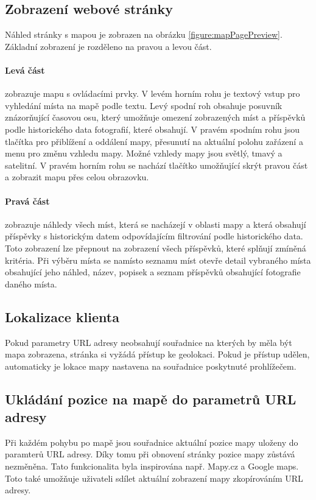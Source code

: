 \documentclass[12pt, a4paper,
 twoside,        %
 openright
]{report}
\begin{document}
\subsection{Zobrazení webové stránky}
Náhled stránky s mapou je zobrazen na obrázku \ref{figure:mapPagePreview}. Základní zobrazení je rozděleno na pravou a levou část.
\paragraph{Levá část} zobrazuje mapu s ovládacími prvky. V levém horním rohu je textový vstup pro vyhledání místa na mapě podle textu. Levý spodní roh obsahuje posuvník znázorňující časovou osu, který umožňuje omezení zobrazených míst a příspěvků podle historického data fotografií, které obsahují. V pravém spodním rohu jsou tlačítka pro přiblížení a oddálení mapy, přesunutí na aktuální polohu zařázení a menu pro změnu vzhledu mapy. Možné vzhledy mapy jsou světlý, tmavý a satelitní. V pravém horním rohu se nachází tlačítko umožňující skrýt pravou část a zobrazit mapu přes celou obrazovku.
\paragraph{Pravá část} zobrazuje náhledy všech míst, která se nacházejí v oblasti mapy a která obsahují příspěvky s historickým datem odpovídajícím filtrování podle historického data. Toto zobrazení lze přepnout na zobrazení všech příspěvků, které splňují zmíněná kritéria. Při výběru místa se namísto seznamu míst otevře detail vybraného místa obsahující jeho náhled, název, popisek a seznam příspěvků obsahující fotografie daného místa.
\subsection{Lokalizace klienta} Pokud parametry URL adresy neobsahují souřadnice na kterých by měla být mapa zobrazena, stránka si vyžádá přístup ke geolokaci. Pokud je přístup udělen, automaticky je lokace mapy nastavena na souřadnice poskytnuté prohlížečem.
\subsection{Ukládání pozice na mapě do parametrů URL adresy}
Při každém pohybu po mapě jsou souřadnice aktuální pozice mapy uloženy do paramterů URL adresy. Díky tomu při obnovení stránky pozice mapy zůstává nezměněna. Tato funkcionalita byla inspirována např. Mapy.cz a Google maps. Toto také umožňuje uživateli sdílet aktuální zobrazení mapy zkopírováním URL adresy.
\end{document}
